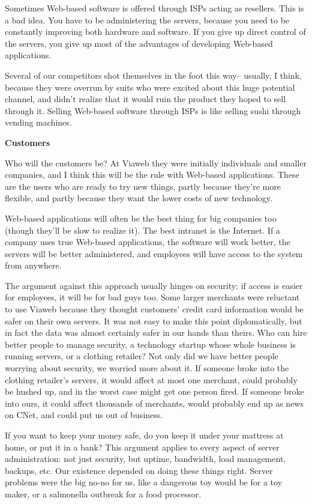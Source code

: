 Sometimes Web-based software is offered through ISPs acting as
resellers. This is a bad idea. You have to be administering the servers,
because you need to be constantly improving both hardware and software.
If you give up direct control of the servers, you give up most of the
advantages of developing Web-based applications.

Several of our competitors shot themselves in the foot this way--
usually, I think, because they were overrun by suits who were excited
about this huge potential channel, and didn't realize that it would ruin
the product they hoped to sell through it. Selling Web-based software
through ISPs is like selling sushi through vending machines.

\textbf{Customers}

Who will the customers be? At Viaweb they were initially individuals and
smaller companies, and I think this will be the rule with Web-based
applications. These are the users who are ready to try new things,
partly because they're more flexible, and partly because they want the
lower costs of new technology.

Web-based applications will often be the best thing for big companies
too (though they'll be slow to realize it). The best intranet is the
Internet. If a company uses true Web-based applications, the software
will work better, the servers will be better administered, and employees
will have access to the system from anywhere.

The argument against this approach usually hinges on security: if access
is easier for employees, it will be for bad guys too. Some larger
merchants were reluctant to use Viaweb because they thought customers'
credit card information would be safer on their own servers. It was not
easy to make this point diplomatically, but in fact the data was almost
certainly safer in our hands than theirs. Who can hire better people to
manage security, a technology startup whose whole business is running
servers, or a clothing retailer? Not only did we have better people
worrying about security, we worried more about it. If someone broke into
the clothing retailer's servers, it would affect at most one merchant,
could probably be hushed up, and in the worst case might get one person
fired. If someone broke into ours, it could affect thousands of
merchants, would probably end up as news on CNet, and could put us out
of business.

If you want to keep your money safe, do you keep it under your mattress
at home, or put it in a bank? This argument applies to every aspect of
server administration: not just security, but uptime, bandwidth, load
management, backups, etc. Our existence depended on doing these things
right. Server problems were the big no-no for us, like a dangerous toy
would be for a toy maker, or a salmonella outbreak for a food processor.

